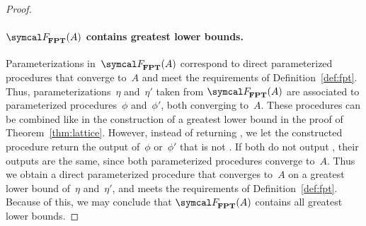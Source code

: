 \begin{proof}
  \paragraph{$\calF_\cl{FPT}(A)$ contains greatest lower bounds.}
  Parameterizations in~$\calF_\cl{FPT}(A)$ correspond to direct parameterized procedures that converge to~$A$ and meet the requirements of Definition~\ref{def:fpt}.
  Thus, parameterizations~$\eta$ and~$\eta'$ taken from $\calF_\cl{FPT}(A)$ are associated to parameterized procedures~$\phi$ and~$\phi'$, both converging to~$A$.
  These procedures can be combined like in the construction of a greatest lower bound in the proof of Theorem~\ref{thm:lattice}.
  However, instead of returning , we let the constructed procedure return the output of~$\phi$ or~$\phi'$ that is not .
  If both do not output , their outputs are the same, since both parameterized procedures converge to~$A$.
  Thus we obtain a direct parameterized procedure that converges to~$A$ on a greatest lower bound of~$\eta$ and~$\eta'$, and meets the requirements of Definition~\ref{def:fpt}.
  Because of this, we may conclude that $\calF_\cl{FPT}(A)$ contains all greatest lower bounds.
\end{proof}

